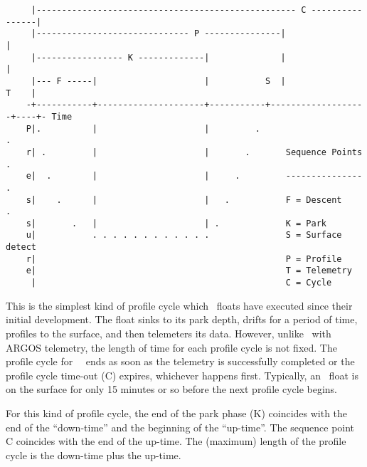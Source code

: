 \begin{minipage}{6in}
\begin{verbatim}
     |--------------------------------------------------- C ----------------|     
     |------------------------------ P ---------------|                     |     
     |----------------- K -------------|              |                     |     
     |--- F -----|                     |           S  |                T    |     
    -+-----------+---------------------+-----------+-------------------+----+- Time
    P|.          |                     |         .                      .    
    r| .         |                     |       .       Sequence Points   .   
    e|  .        |                     |     .         ---------------    .  
    s|    .      |                     |   .           F = Descent          .
    s|       .   |                     | .             K = Park
    u|           . . . . . . . . . . . .               S = Surface detect
    r|                                                 P = Profile           
    e|                                                 T = Telemetry
     |                                                 C = Cycle
\end{verbatim}                    
\end{minipage}

This is the simplest kind of profile cycle which \apex\ floats have executed
since their initial development.  The float sinks to its park depth, drifts
for a period of time, profiles to the surface, and then telemeters its data.
However, unlike \apex\ with ARGOS telemetry, the length of time for each
profile cycle is not fixed.  The profile cycle for \iridium\ \apex\ ends as
soon as the telemetry is successfully completed or the profile cycle
time-out (C) expires, whichever happens first.  Typically, an \iridium\
float is on the surface for only 15 minutes or so before the next profile
cycle begins.

For this kind of profile cycle, the end of the park phase (K) coincides with
the end of the ``down-time'' and the beginning of the ``up-time''.  The
sequence point C coincides with the end of the up-time.  The (maximum)
length of the profile cycle is the down-time plus the up-time. 

